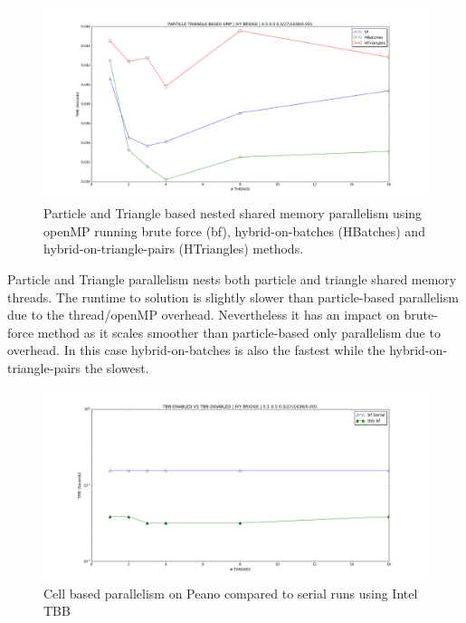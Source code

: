 \begin{figure}[htb]
  \begin{center}
    \includegraphics[width=1\textwidth]{experiments/random/omp/particle_triangle_based_x0.png}
  \end{center}
  \caption{Particle and Triangle based nested shared memory parallelism using openMP running brute force (bf), hybrid-on-batches (HBatches) and hybrid-on-triangle-pairs (HTriangles) methods.}
  \label{figure:particletriangle_omp}
\end{figure}

Particle and Triangle parallelism nests both particle and triangle shared memory threads. The runtime to solution is slightly slower than particle-based parallelism due to the thread/openMP overhead. Nevertheless it has an impact on brute-force method as it scales smoother than particle-based only parallelism due to overhead. In this case hybrid-on-batches is also the fastest while the hybrid-on-triangle-pairs the slowest. 

\clearpage

\begin{figure}[htb]
  \begin{center}
    \includegraphics[width=1\textwidth]{experiments/random/omp/tbb_vs_serial.png}
  \end{center}
  \caption{Cell based parallelism on Peano compared to serial runs using Intel TBB}
  \label{figure:tbb_vs_serial}
\end{figure}

